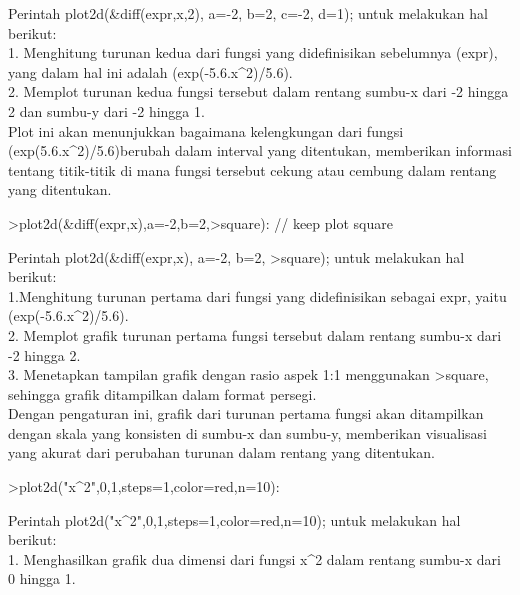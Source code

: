 \documentclass{article}
\begin{document}
\begin{eulernotebook}
\begin{eulercomment}
\begin{eulercomment}
\begin{eulercomment}
\begin{eulercomment}
\begin{eulercomment}
Perintah plot2d(\&diff(expr,x,2), a=-2, b=2, c=-2, d=1); untuk
melakukan hal berikut:\\
1. Menghitung turunan kedua dari fungsi yang didefinisikan sebelumnya
(expr), yang dalam hal ini adalah (exp(-5.6.x\textasciicircum{}2)/5.6).\\
2. Memplot turunan kedua fungsi tersebut dalam rentang sumbu-x dari -2
hingga 2 dan sumbu-y dari -2 hingga 1.\\
Plot ini akan menunjukkan bagaimana kelengkungan dari fungsi
(exp(5.6.x\textasciicircum{}2)/5.6)berubah dalam interval yang ditentukan, memberikan
informasi tentang titik-titik di mana fungsi tersebut cekung atau
cembung dalam rentang yang ditentukan.
\end{eulercomment}
\begin{eulerprompt}
>plot2d(&diff(expr,x),a=-2,b=2,>square): // keep plot square
\end{eulerprompt}
\begin{eulercomment}
Perintah plot2d(\&diff(expr,x), a=-2, b=2, \textgreater{}square); untuk melakukan
hal berikut:\\
1.Menghitung turunan pertama dari fungsi yang didefinisikan sebagai
expr, yaitu (exp(-5.6.x\textasciicircum{}2)/5.6).\\
2. Memplot grafik turunan pertama fungsi tersebut dalam rentang
sumbu-x dari -2 hingga 2.\\
3. Menetapkan tampilan grafik dengan rasio aspek 1:1 menggunakan
\textgreater{}square, sehingga grafik ditampilkan dalam format persegi.\\
Dengan pengaturan ini, grafik dari turunan pertama fungsi akan
ditampilkan dengan skala yang konsisten di sumbu-x dan sumbu-y,
memberikan visualisasi yang akurat dari perubahan turunan dalam
rentang yang ditentukan.
\end{eulercomment}
\begin{eulerprompt}
>plot2d("x^2",0,1,steps=1,color=red,n=10):
\end{eulerprompt}
\begin{eulercomment}
Perintah plot2d("x\textasciicircum{}2",0,1,steps=1,color=red,n=10); untuk melakukan hal
berikut:\\
1. Menghasilkan grafik dua dimensi dari fungsi x\textasciicircum{}2 dalam rentang
sumbu-x dari 0 hingga 1.\\

\end{eulercomment}
\end{eulercomment}
\end{eulercomment}
\end{eulercomment}
\end{eulercomment}
\end{eulernotebook}
\end{document}
